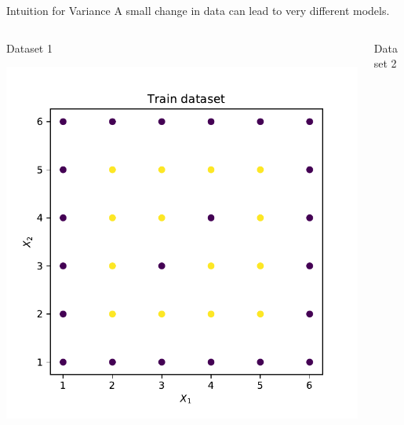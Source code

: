 \documentclass[aspectratio=169,10pt]{beamer}
\newcommand{\fitpic}[1]{\begin{adjustbox}{max width=\linewidth, max totalheight=0.78\textheight}#1\end{adjustbox}}
\begin{document}
	\begin{frame}{Intuition for Variance}
	A small change in data can lead to very different models.\\
	\vspace{1cm}
	\begin{columns}
		\begin{column}{0.5\textwidth}{\hspace{1.75cm} Dataset 1}
			\begin{center}
			\fitpic{\includegraphics[width = \textwidth]{dataset-2-train}}
			\end{center}
		\end{column}
		\begin{column}{0.5\textwidth}{\hspace{1.75cm} Dataset 2}
			\begin{center}

\end{center}
\end{column}
\end{columns}
\end{frame}
\end{document}
